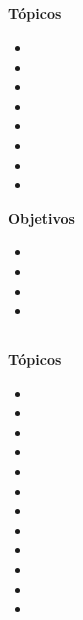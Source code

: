 \subsection{\NCOCHODef }\label{sec:BOK-NC8}

\textbf{Tópicos}
\begin{itemize}
	\item \NCOCHOTopicSonido
	\item \NCOCHOTopicEstandares
	\item \NCOCHOTopicPlaneamiento
	\item \NCOCHOTopicDispositivos
	\item \NCOCHOTopicTeclado
	\item \NCOCHOTopicEstandaresde
	\item \NCOCHOTopicServidores
	\item \NCOCHOTopicHerramientas
\end{itemize}

\textbf{Objetivos}
\begin{itemize}
	\item \NCOCHOObjUNO
	\item \NCOCHOObjDOS
	\item \NCOCHOObjTRES
	\item \NCOCHOObjCUATRO
\end{itemize}

\subsection{\NCNUEVEDef }\label{sec:BOK-NC9}

\textbf{Tópicos}
\begin{itemize}
	\item \NCNUEVETopicVista
	\item \NCNUEVETopicLos
	\item \NCNUEVETopicRedes
	\item \NCNUEVETopicCiclos
	\item \NCNUEVETopicProtocolos
	\item \NCNUEVETopicAdaptacion
	\item \NCNUEVETopicExtension
	\item \NCNUEVETopicAcceso
	\item \NCNUEVETopicSoporte
	\item \NCNUEVETopicEl
	\item \NCNUEVETopicProblemas
	\item \NCNUEVETopicTecnologias
\end{itemize}


